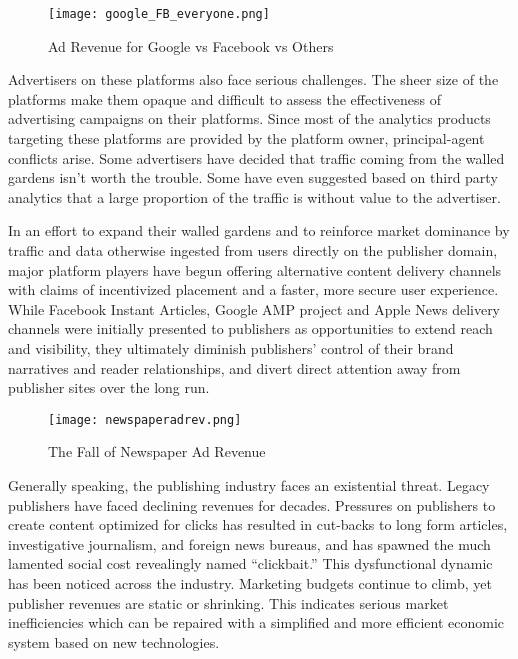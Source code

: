 \documentclass[11pt]{article}
\begin{document}
\begin{figure}
\begin{center}
\texttt{[image: google\_FB\_everyone.png]}
\caption{Ad Revenue for Google vs Facebook vs Others}
\end{center}
\end{figure}



Advertisers on these platforms also face serious challenges. The sheer size of the platforms make them opaque and difficult to assess the effectiveness of advertising campaigns on their platforms. Since most of the analytics products targeting these platforms are provided by the platform owner, principal-agent conflicts arise. Some advertisers have decided that traffic coming from the walled gardens isn't worth the trouble. Some have even suggested based on third party analytics that a large proportion of the traffic is without value to the advertiser\cite{WithoutValue}.

In an effort to expand their walled gardens and to reinforce market dominance by traffic and data otherwise ingested from users directly on the publisher domain, major platform players have begun offering alternative content delivery channels with claims of incentivized placement and a faster, more secure user experience. While Facebook Instant Articles, Google AMP project and Apple News delivery channels were initially presented to publishers as opportunities to extend reach and visibility, they ultimately diminish publishers' control of their brand narratives and reader relationships, and divert direct attention away from publisher sites over the long run.


\begin{figure}
\begin{center}
\texttt{[image: newspaperadrev.png]}
\caption{The Fall of Newspaper Ad Revenue}
\end{center}
\end{figure}


Generally speaking, the publishing industry faces an existential threat. Legacy publishers have faced declining revenues for decades. Pressures on publishers to create content optimized for clicks has resulted in cut-backs to long form articles, investigative journalism, and foreign news bureaus, and has spawned the much lamented social cost revealingly named ``clickbait.''
This dysfunctional dynamic has been noticed across the industry. Marketing budgets continue to climb\cite{Gartner1}, yet publisher revenues are static or shrinking\cite{Econsul}. This indicates serious market inefficiencies which can be repaired with a simplified and more efficient economic system based on new technologies.
\end{document}
